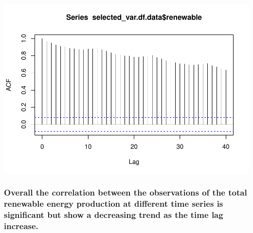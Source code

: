 \documentclass[
]{article}
\newenvironment{Shaded}{\begin{snugshade}}{\end{snugshade}}
\newcommand{\AttributeTok}[1]{\textcolor[rgb]{0.77,0.63,0.00}{#1}}
\newcommand{\ConstantTok}[1]{\textcolor[rgb]{0.00,0.00,0.00}{#1}}
\newcommand{\DecValTok}[1]{\textcolor[rgb]{0.00,0.00,0.81}{#1}}
\newcommand{\FunctionTok}[1]{\textcolor[rgb]{0.00,0.00,0.00}{#1}}
\newcommand{\NormalTok}[1]{#1}
\newcommand{\OtherTok}[1]{\textcolor[rgb]{0.56,0.35,0.01}{#1}}
\newcommand{\SpecialCharTok}[1]{\textcolor[rgb]{0.00,0.00,0.00}{#1}}
\begin{document}
\begin{Shaded}
\end{Shaded}

\includegraphics{YaredAsfaw_TSA_A02_Sp22_files/figure-latex/unnamed-chunk-19-1.pdf}

\hypertarget{overall-the-correlation-between-the-observations-of-the-total-renewable-energy-production-at-different-time-series-is-significant-but-show-a-decreasing-trend-as-the-time-lag-increase.}{%
\subsubsection{Overall the correlation between the observations of the
total renewable energy production at different time series is
significant but show a decreasing trend as the time lag
increase.}\label{overall-the-correlation-between-the-observations-of-the-total-renewable-energy-production-at-different-time-series-is-significant-but-show-a-decreasing-trend-as-the-time-lag-increase.}}

\begin{Shaded}
\end{Shaded}
\end{document}

